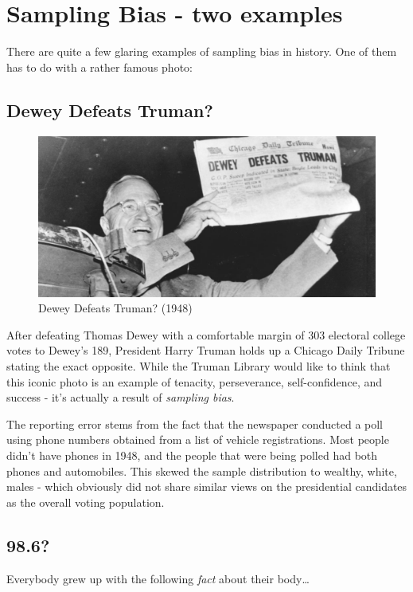 \documentclass[
]{book}
\begin{document}
\section{Sampling Bias - two examples}\label{sampling-bias---two-examples}

There are quite a few glaring examples of sampling bias in history. One of them has to do with a rather famous photo:

\subsection{Dewey Defeats Truman?}\label{dewey-defeats-truman}

\begin{figure}

{\centering \includegraphics[width=0.5\linewidth]{images/timeline-truman-second-term} 

}

\caption{Dewey Defeats Truman? (1948)}\label{fig:unnamed-chunk-21}
\end{figure}

After defeating Thomas Dewey with a comfortable margin of 303 electoral college votes to Dewey's 189, President Harry Truman holds up a Chicago Daily Tribune stating the exact opposite. While the Truman Library would like to think that this iconic photo is an example of tenacity, perseverance, self-confidence, and success - it's actually a result of \emph{sampling bias}.

The reporting error stems from the fact that the newspaper conducted a poll using phone numbers obtained from a list of vehicle registrations. Most people didn't have phones in 1948, and the people that were being polled had both phones and automobiles. This skewed the sample distribution to wealthy, white, males - which obviously did not share similar views on the presidential candidates as the overall voting population.

\subsection{98.6?}\label{section-1}

Everybody grew up with the following \emph{fact} about their body\ldots{}
\end{document}
